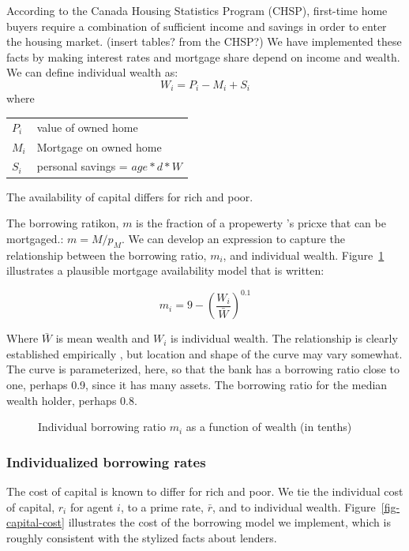 According to the Canada Housing Statistics Program (CHSP), first-time home buyers require a combination of sufficient income and savings in order to enter the housing market. (insert tables? from the CHSP?) We have implemented these facts by making interest rates and mortgage share depend on income and wealth.
We can define individual wealth as:
\[W_i= P_i -M_i  +S_i\]
where 

\begin{tabular}{ll}
$P_i$ & value of owned home\\
$M_i$ & Mortgage on owned home\\
$S_i$ & personal savings = $age*d*W$\\
\end{tabular}

The availability of capital differs for rich and poor. 

The borrowing ratikon, $m$ is the fraction of a propewerty 's pricxe that can be mortgaged.: $m=M/p_M$. We can develop an expression to capture the relationship between the \gls{borrowing ratio}, $m_i$,  and individual wealth. Figure~\ref{fig-borrowing-ratio} illustrates a plausible mortgage availability  model that is written:

 \[ m_i = 9-\left(\frac{W_i}{\bar W}\right)^{0.1} \]

 
Where $\bar{W}$ is mean wealth and $W_i$ is individual wealth. 
The relationship is clearly established empirically \cite{}, but location and shape of the curve may vary somewhat. The curve is parameterized, here, so that the bank has a borrowing ratio close to one, perhaps 0.9, since it has many assets. The borrowing ratio for the median wealth holder, perhaps 0.8.



\begin{figure}[htb]
\begin{center}

\end{center}
\caption{Individual borrowing ratio $m_i$ as a function of wealth (in tenths)}
\label{fig-borrowing-ratio}
\end{figure}


\subsubsection{Individualized borrowing rates} \label{section-borowing-rate}

 The cost of capital is known to differ for rich and poor. We tie the individual cost of capital,  $r_i$ for agent $i$, to a prime rate, $\bar r$, and to individual wealth. Figure~\ref{fig-capital-cost} illustrates the cost of the borrowing model we implement, which is  roughly consistent  with the stylized facts about lenders. 
 
